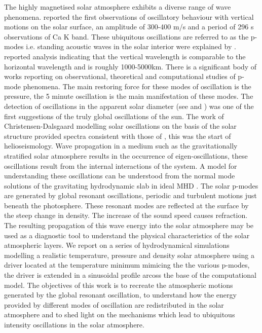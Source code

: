 \documentclass[authoryear,final,1p]{elsarticle}
\begin{document}
The highly magnetised solar atmosphere exhibits a diverse range of wave phenomena. \citet{Leighton1960} reported the first observations of oscillatory behaviour with  vertical motions on the solar surface, an amplitude of 300-400 m/s and a period of 296 s observations of Ca K band. These ubiquitous oscillations are referred to as the p-modes i.e. standing acoustic waves in the solar interior were explained by \citet{Ulrich1970}. \citet{Leibacher1971} reported analysis indicating that the vertical wavelength is comparable to the horizontal wavelength and is roughly 1000-5000km. There is a significant body of works reporting on observational, theoretical and computational studies of p-mode phenomena.  The main restoring force for these modes of oscillation is the pressure, the 5 minute oscillation is the main manifestation of these modes. The detection of oscillations in the apparent solar diameter (see \citet{Hill1976} and \citet{Brown1978}) was one of the first suggestions of the truly global oscillations of the sun.  The work of Christensen-Dalsgaard modelling solar oscillations on the basis of the solar structure provided spectra consistent with those of \citet{Hill1976}, this was the start of helioseismology. Wave propagation in a medium such as the gravitationally stratified solar atmosphere results in the occurrence of eigen-oscillations, these oscillations result from the internal interactions of the system. A model for understanding these oscillations can be understood from the normal mode solutions of the gravitating  hydrodynamic slab in ideal MHD \citet{Goedbloed&Poets}. The solar p-modes are generated by global resonant oscillations, periodic  and turbulent motions just beneath the photosphere.  These resonant modes are reflected at the surface by the steep change in density. The increase of the sound speed causes refraction.   The resulting propagation of this wave energy into the solar atmosphere may be used as a diagnostic tool to understand the physical characteristics of the  solar atmospheric layers. We report on a series of hydrodynamical simulations modelling a realistic temperature, pressure and density solar atmosphere using a driver located at the temperature minimum mimicing the the various p-modes, the driver is extended in a sinusoidal profile arcoss the base of the computational model.  The objectives of this work is to recreate the atmospheric motions generated by the global resonant oscillation, to  understand how the energy provided by different modes of oscillation are redistributed in the solar atmosphere and to shed light on the mechanisms which lead to ubiquitous intensity oscillations in the solar atmosphere.   
\end{document}
